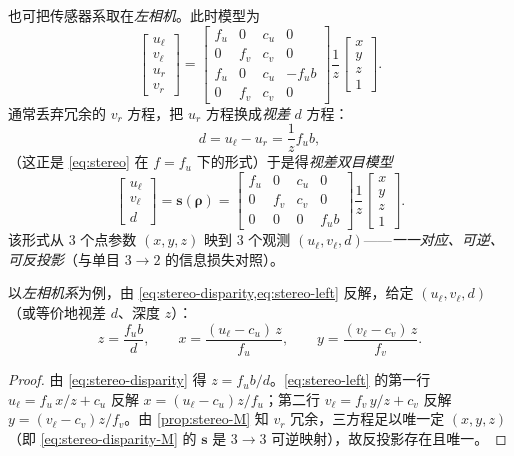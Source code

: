 \noindent 也可把传感器系取在\emph{左相机}。此时模型为
\begin{equation}
  \begin{bmatrix}u_\ell\\v_\ell\\u_r\\v_r\end{bmatrix}
  =\begin{bmatrix}f_u&0&c_u&0\\0&f_v&c_v&0\\f_u&0&c_u&-f_u b\\0&f_v&c_v&0\end{bmatrix}
  \frac1z\begin{bmatrix}x\\y\\z\\1\end{bmatrix}.
  \label{eq:stereo-left}
\end{equation}
通常丢弃冗余的 $v_r$ 方程，把 $u_r$ 方程换成\emph{视差} $d$ 方程：
\begin{equation}
  d=u_\ell-u_r=\frac1z f_u b,
  \label{eq:stereo-disparity}
\end{equation}
（这正是 \cref{eq:stereo} 在 $f=f_u$ 下的形式）于是得\emph{视差双目模型}
\begin{equation}
  \begin{bmatrix}u_\ell\\v_\ell\\d\end{bmatrix}=\mathbf{s}(\boldsymbol\rho)
  =\begin{bmatrix}f_u&0&c_u&0\\0&f_v&c_v&0\\0&0&0&f_u b\end{bmatrix}
  \frac1z\begin{bmatrix}x\\y\\z\\1\end{bmatrix}.
  \label{eq:stereo-disparity-M}
\end{equation}
该形式从 $3$ 个点参数 $(x,y,z)$ 映到 $3$ 个观测 $(u_\ell,v_\ell,d)$——\emph{一一对应、可逆、可反投影}（与单目 $3\to2$ 的信息损失对照）。

\begin{theorem}[双目反投影]\label{thm:stereo-backproj}
以\emph{左相机系}为例，由 \cref{eq:stereo-disparity,eq:stereo-left} 反解，给定 $(u_\ell,v_\ell,d)$（或等价地视差 $d$、深度 $z$）：
\begin{equation}
  z=\frac{f_u b}{d},\qquad
  x=\frac{(u_\ell-c_u)\,z}{f_u},\qquad
  y=\frac{(v_\ell-c_v)\,z}{f_v}.
  \label{eq:stereo-backproj}
\end{equation}
\end{theorem}
\begin{proof}
由 \cref{eq:stereo-disparity} 得 $z=f_u b/d$。\cref{eq:stereo-left} 的第一行 $u_\ell=f_u\,x/z+c_u$ 反解 $x=(u_\ell-c_u)z/f_u$；第二行 $v_\ell=f_v\,y/z+c_v$ 反解 $y=(v_\ell-c_v)z/f_v$。由 \cref{prop:stereo-M} 知 $v_r$ 冗余，三方程足以唯一定 $(x,y,z)$（即 \cref{eq:stereo-disparity-M} 的 $\mathbf{s}$ 是 $3\to3$ 可逆映射），故反投影存在且唯一。
\end{proof}

